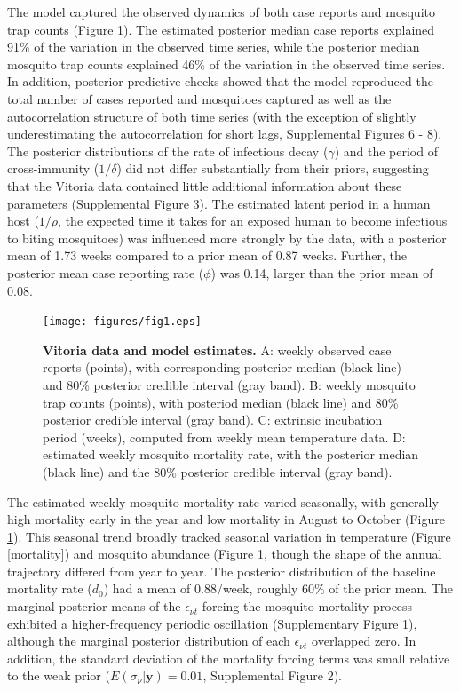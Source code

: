 \documentclass[10pt,letterpaper]{article}
\begin{document}
The model captured the observed dynamics of both case reports and mosquito trap counts (Figure \ref{timeseries}).
The estimated posterior median case reports explained 91\% of the variation in the observed time series, while the posterior median mosquito trap counts explained 46\% of the variation in the observed time series. 
In addition, posterior predictive checks showed that the model reproduced the total number of cases reported and mosquitoes captured as well as the autocorrelation structure of both time series (with the exception of slightly underestimating the autocorrelation for short lags, Supplemental Figures 6 - 8).
The posterior distributions of the rate of infectious decay ($\gamma$) and the period of cross-immunity ($1/\delta$) did not differ substantially from their priors, suggesting that the Vitoria data contained little additional information about these parameters (Supplemental Figure 3).
The estimated latent period in a human host ($1/\rho$, the expected time it takes for an exposed human to become infectious to biting mosquitoes) was influenced more strongly by the data, with a posterior mean of 1.73 weeks compared to a prior mean of 0.87 weeks.
Further, the posterior mean case reporting rate ($\phi$) was 0.14, larger than the prior mean of 0.08.

\begin{figure}[!h]
\texttt{[image: figures/fig1.eps]}
\caption{{\bf Vitoria data and model estimates.}
A: weekly observed case reports (points), with corresponding posterior median (black line) and 80\% posterior credible interval (gray band). B: weekly mosquito trap counts (points), with posteriod median (black line) and 80\% posterior credible interval (gray band). C: extrinsic incubation period (weeks), computed from weekly mean temperature data. D: estimated weekly mosquito mortality rate, with the posterior median (black line) and the 80\% posterior credible interval (gray band).
}
\label{timeseries}
\end{figure}

The estimated weekly mosquito mortality rate varied seasonally, with generally high mortality early in the year and low mortality in August to October (Figure \ref{timeseries}).
This seasonal trend broadly tracked seasonal variation in temperature (Figure \ref{mortality}) and mosquito abundance (Figure \ref{timeseries}, though the shape of the annual trajectory differed from year to year.
The posterior distribution of the baseline mortality rate ($d_0$) had a mean of 0.88/week, roughly $60\%$ of the prior mean.
The marginal posterior means of the $\epsilon_{\nu t}$ forcing the mosquito mortality process exhibited a higher-frequency periodic oscillation (Supplementary Figure 1), although the marginal posterior distribution of each $\epsilon_{\nu t}$ overlapped zero.
In addition, the standard deviation of the mortality forcing terms was small relative to the weak prior ($E(\sigma_{\nu}|\mathbf{y}) = 0.01$, Supplemental Figure 2).
\end{document}
